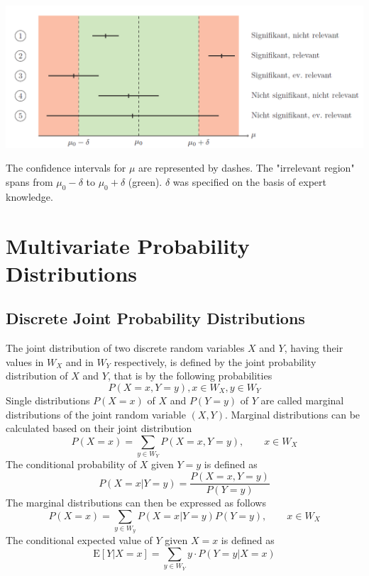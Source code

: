 \documentclass[11pt]{article}
\newcommand*\ev[1]{\mathrel{\text{E}\left[#1\right]}}
\begin{document}
\begin{center}
	\includegraphics[width=0.95\linewidth]{img/statistical-relevance}
\end{center}
The confidence intervals for $\mu$ are represented by dashes. The "irrelevant region"
spans from $\mu_0 - \delta$ to $\mu_0 + \delta$ (green). $\delta$ was specified on the basis of expert knowledge.

\newpage \newpage
\section{Multivariate Probability Distributions}

\subsection{Discrete Joint Probability Distributions}
The joint distribution of two discrete random variables $X$ and $Y$, having their values in $W_X$ and in $W_Y$ respectively, is defined by the joint probability distribution of $X$ and $Y$, that is by the following probabilities
\begin{equation*}
	P(X=x, Y=y), x\in W_X, y\in W_Y
\end{equation*}
Single distributions $P(X = x)$ of $X$ and $P(Y = y)$ of $Y$ are called marginal distributions of the joint random variable $(X,Y)$. Marginal distributions can be calculated based on their joint distribution
\begin{equation*}
	P(X=x) = \sum_{y\in W_Y} P(X = x, Y = y),\qquad x\in W_X
\end{equation*}
The conditional probability of $X$ given $Y=y$ is defined as
\begin{equation*}
	P(X = x | Y = y) = \frac{P(X = x, Y = y)}{P(Y=y)}
\end{equation*}
The marginal distributions can then be expressed as follows
\begin{equation*}
	P(X=x) = \sum_{y\in W_y} P(X=x|Y=y)P(Y=y),\qquad x\in W_X
\end{equation*}
The conditional expected value of $Y$ given $X=x$ is defined as
\begin{equation*}
	\ev{Y|X=x} = \sum_{y\in W_Y} y\cdot P(Y=y|X=x)
\end{equation*}
\end{document}

